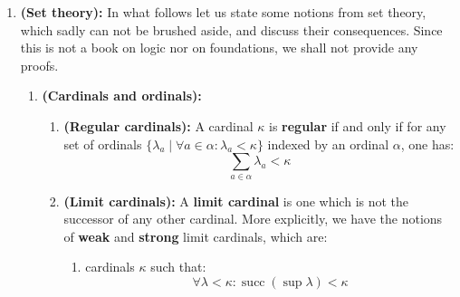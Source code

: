 \begin{enumerate}
\begin{enumerate}
\begin{enumerate}
                            $$
                                \begin{tikzcd}
                                	{[\C, \S]} && {[\D, \S]}
                                	\arrow[""{name=0, anchor=center, inner sep=0}, "{F^*}"{description}, from=1-3, to=1-1]
                                	\arrow[""{name=1, anchor=center, inner sep=0}, "{F_*}"', shift right=3, from=1-1, to=1-3]
                                	\arrow[""{name=2, anchor=center, inner sep=0}, "{F_!}", shift left=4, from=1-1, to=1-3]
                                	\arrow["\dashv"{anchor=center, rotate=-90}, draw=none, from=2, to=0]
                                	\arrow["\dashv"{anchor=center, rotate=-90}, draw=none, from=0, to=1]
                                \end{tikzcd}
                            $$
                    \end{enumerate}
            \end{enumerate}
        \item \textbf{(Set theory):} In what follows let us state some notions from set theory, which sadly can not be brushed aside, and discuss their consequences. Since this is not a book on logic nor on foundations, we shall not provide any proofs.
            \begin{enumerate}
                \item \textbf{(Cardinals and ordinals):}
                    \begin{definition} \label{def: limit_cardinal}
                        \noindent
                        \begin{enumerate}
                            \item \textbf{(Regular cardinals):} A cardinal $\kappa$ is \textbf{regular} if and only if for any set of ordinals $\{\lambda_a \mid \forall a \in \alpha: \lambda_a < \kappa\}$ indexed by an ordinal $\alpha$, one has:
                            $$\sum_{a \in \alpha} \lambda_a < \kappa$$ 
                            \item \textbf{(Limit cardinals):} A \textbf{limit cardinal} is one which is not the successor of any other cardinal. More explicitly, we have the notions of \textbf{weak} and \textbf{strong} limit cardinals, which are:
                                \begin{enumerate}
                                    \item cardinals $\kappa$ such that:
                                        $$\forall \lambda < \kappa: \operatorname{succ} (\sup \lambda) < \kappa$$

\end{enumerate}
\end{enumerate}
\end{definition}
\end{enumerate}
\end{enumerate}
